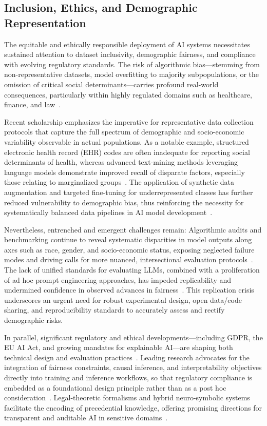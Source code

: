 \documentclass[sigconf]{acmart}
\begin{document}
\subsection{Inclusion, Ethics, and Demographic Representation}

The equitable and ethically responsible deployment of AI systems necessitates sustained attention to dataset inclusivity, demographic fairness, and compliance with evolving regulatory standards. The risk of algorithmic bias—stemming from non-representative datasets, model overfitting to majority subpopulations, or the omission of critical social determinants—carries profound real-world consequences, particularly within highly regulated domains such as healthcare, finance, and law~\cite{ref1,ref2,ref10,ref21,ref22,ref23,ref42,ref43,ref44,ref49,ref52,ref53,ref65}.

Recent scholarship emphasizes the imperative for representative data collection protocols that capture the full spectrum of demographic and socio-economic variability observable in actual populations. As a notable example, structured electronic health record (EHR) codes are often inadequate for reporting social determinants of health, whereas advanced text-mining methods leveraging language models demonstrate improved recall of disparate factors, especially those relating to marginalized groups~\cite{ref44,ref53}. The application of synthetic data augmentation and targeted fine-tuning for underrepresented classes has further reduced vulnerability to demographic bias, thus reinforcing the necessity for systematically balanced data pipelines in AI model development~\cite{ref2,ref21,ref22,ref65}.

Nevertheless, entrenched and emergent challenges remain: Algorithmic audits and benchmarking continue to reveal systematic disparities in model outputs along axes such as race, gender, and socio-economic status, exposing neglected failure modes and driving calls for more nuanced, intersectional evaluation protocols~\cite{ref1,ref10,ref43,ref52,ref53}. The lack of unified standards for evaluating LLMs, combined with a proliferation of ad hoc prompt engineering approaches, has impeded replicability and undermined confidence in observed advances in fairness~\cite{ref21,ref22,ref23,ref42}. This replication crisis underscores an urgent need for robust experimental design, open data/code sharing, and reproducibility standards to accurately assess and rectify demographic risks.

In parallel, significant regulatory and ethical developments—including GDPR, the EU AI Act, and growing mandates for explainable AI—are shaping both technical design and evaluation practices~\cite{ref42,ref49,ref65}. Leading research advocates for the integration of fairness constraints, causal inference, and interpretability objectives directly into training and inference workflows, so that regulatory compliance is embedded as a foundational design principle rather than as a post hoc consideration~\cite{ref10,ref44,ref49,ref52,ref65}. Legal-theoretic formalisms and hybrid neuro-symbolic systems facilitate the encoding of precedential knowledge, offering promising directions for transparent and auditable AI in sensitive domains~\cite{ref46,ref49,ref50,ref53}.
\end{document}

